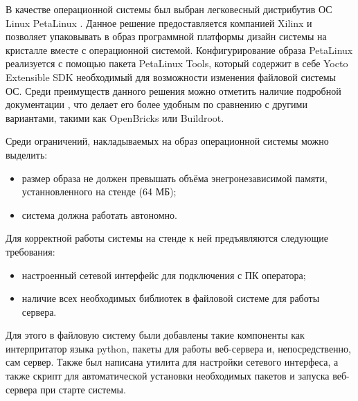 В качестве операционной системы был выбран легковесный дистрибутив ОС Linux PetaLinux \parencite{PetaLinuxRG}. Данное решение предоставляется компанией Xilinx и позволяет упаковывать в образ программной платформы дизайн системы на кристалле вместе с операционной системой. Конфигурирование образа PetaLinux реализуется с помощью пакета PetaLinux Tools, который содержит в себе Yocto Extensible SDK необходимый для возможности изменения файловой системы ОС. Среди преимуществ данного решения можно отметить наличие подробной документации \parencite{PetaLinuxWT, PetaLinuxCLRG}, что делает его более удобным по сравнению с другими вариантами, такими как OpenBricks или Buildroot.\par
Среди ограничений, накладываемых на образ операционной системы можно выделить:\par
\begin{itemize}
    \item размер образа не должен превышать объёма энегронезависимой памяти, устанновленного на стенде (64 МБ);
    \item система должна работать автономно.
\end{itemize}\par
Для корректной работы системы на стенде к ней предъявляются следующие требования:\par
\begin{itemize}
    \item настроенный сетевой интерфейс для подключения с ПК оператора;
    \item наличие всех необходимых библиотек в файловой системе для работы сервера.
\end{itemize}\par
Для этого в файловую систему были добавлены такие компоненты как интерпритатор языка python, пакеты для работы веб-сервера и, непосредственно, сам сервер. Также был написана утилита для настройки сетевого интерфеса, а также скрипт для автоматической установки необходимых пакетов и запуска веб-сервера при старте системы.
